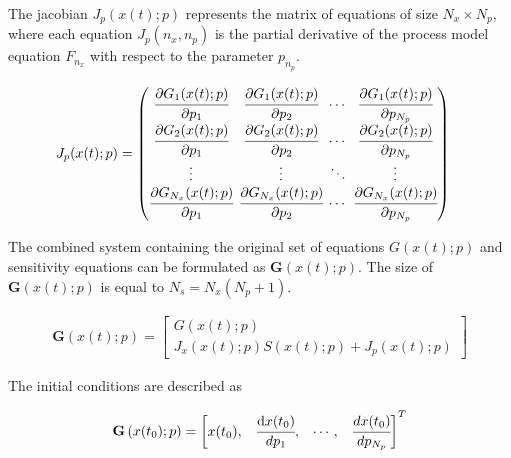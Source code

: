 \documentclass[../Article_Model_Parameters.tex]{subfiles}
\begin{document}
	The jacobian ${J_p}({x}(t);{p})$ represents the matrix of equations of size $N_x \times N_p$, where each equation ${J_p}(n_x,n_p)$ is the partial derivative of the process model equation $F_{n_x}$ with respect to the parameter $p_{n_p}$.
	
	{\footnotesize
		\begin{align}
			{J_p}({x}(t);{p}) & =
			\begingroup %
			\setlength\arraycolsep{2pt}
			\begin{pmatrix}
				\cfrac{\partial {G_{1}}({x}(t);{p})}{\partial {p_{1}}} & \cfrac{\partial {G_{1}}({x}(t);{p})}{\partial {p_{2}}} & \cdots & \cfrac{\partial {G_{1}}({x}(t);{p})}{\partial {p_{N_p}}}\\
				\cfrac{\partial {G_{2}}({x}(t);{p})}{\partial {p_{1}}} & \cfrac{\partial {G_{2}}({x}(t);{p})}{\partial {p_{2}}} & \cdots & \cfrac{\partial {G_{2}}({x}(t);{p})}{\partial {p_{N_p}}}\\
				\vdots & \vdots & \ddots & \vdots\\
				\cfrac{\partial {G_{N_x}}({x}(t);{p})}{\partial {p_{1}}} & \cfrac{\partial {G_{N_x}}({x}(t);{p})}{\partial {p_{2}}} & \cdots & \cfrac{\partial {G_{N_x}}({x}(t);{p})}{\partial {p_{N_p}}}
			\end{pmatrix}
			\endgroup
	\end{align}}
	
	The combined system containing the original set of equations ${G}({x}(t);{p})$ and sensitivity equations can be formulated as ${\textbf{G}}\left({x}(t);{p}\right)$. The size of ${\textbf{G}}\left({x}(t);{p}\right)$ is equal to $N_s = N_x(N_p + 1)$.
	
	{\footnotesize
		\begin{align}
			{\textbf{G}}\left({x}(t);{p}\right) = 
			\begin{bmatrix}
				{G}({x}(t);{p})\\
				{J_x}({x}(t);{p}){S}({x}(t);{p}) + {J_p}({x}(t);{p})
			\end{bmatrix}
	\end{align} }
	
	The initial conditions are described as
	
	{\footnotesize
		\begin{align}
			{\textbf{G}}\left({x}(t_0);{p}\right)  = 
			\begin{bmatrix} {x}(t_0),			& 
				\cfrac{ \text{d}{x}(t_0) }{ d{p_1} },		& 
				\cdots,					 	&
				\cfrac{ d{x}(t_0) }{ d{p_{N_p}} } 
			\end{bmatrix}^T
	\end{align} }
	
\end{document}
